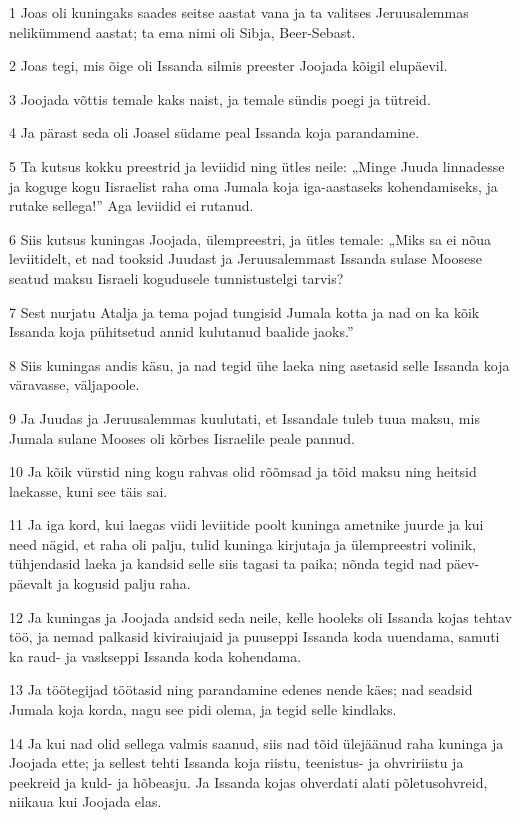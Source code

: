 \par 1 Joas oli kuningaks saades seitse aastat vana ja ta valitses Jeruusalemmas nelikümmend aastat; ta ema nimi oli Sibja, Beer-Sebast.
\par 2 Joas tegi, mis õige oli Issanda silmis preester Joojada kõigil elupäevil.
\par 3 Joojada võttis temale kaks naist, ja temale sündis poegi ja tütreid.
\par 4 Ja pärast seda oli Joasel südame peal Issanda koja parandamine.
\par 5 Ta kutsus kokku preestrid ja leviidid ning ütles neile: „Minge Juuda linnadesse ja koguge kogu Iisraelist raha oma Jumala koja iga-aastaseks kohendamiseks, ja rutake sellega!” Aga leviidid ei rutanud.
\par 6 Siis kutsus kuningas Joojada, ülempreestri, ja ütles temale: „Miks sa ei nõua leviitidelt, et nad tooksid Juudast ja Jeruusalemmast Issanda sulase Moosese seatud maksu Iisraeli kogudusele tunnistustelgi tarvis?
\par 7 Sest nurjatu Atalja ja tema pojad tungisid Jumala kotta ja nad on ka kõik Issanda koja pühitsetud annid kulutanud baalide jaoks.”
\par 8 Siis kuningas andis käsu, ja nad tegid ühe laeka ning asetasid selle Issanda koja väravasse, väljapoole.
\par 9 Ja Juudas ja Jeruusalemmas kuulutati, et Issandale tuleb tuua maksu, mis Jumala sulane Mooses oli kõrbes Iisraelile peale pannud.
\par 10 Ja kõik vürstid ning kogu rahvas olid rõõmsad ja tõid maksu ning heitsid laekasse, kuni see täis sai.
\par 11 Ja iga kord, kui laegas viidi leviitide poolt kuninga ametnike juurde ja kui need nägid, et raha oli palju, tulid kuninga kirjutaja ja ülempreestri volinik, tühjendasid laeka ja kandsid selle siis tagasi ta paika; nõnda tegid nad päev-päevalt ja kogusid palju raha.
\par 12 Ja kuningas ja Joojada andsid seda neile, kelle hooleks oli Issanda kojas tehtav töö, ja nemad palkasid kiviraiujaid ja puuseppi Issanda koda uuendama, samuti ka raud- ja vaskseppi Issanda koda kohendama.
\par 13 Ja töötegijad töötasid ning parandamine edenes nende käes; nad seadsid Jumala koja korda, nagu see pidi olema, ja tegid selle kindlaks.
\par 14 Ja kui nad olid sellega valmis saanud, siis nad tõid ülejäänud raha kuninga ja Joojada ette; ja sellest tehti Issanda koja riistu, teenistus- ja ohvririistu ja peekreid ja kuld- ja hõbeasju. Ja Issanda kojas ohverdati alati põletusohvreid, niikaua kui Joojada elas.
